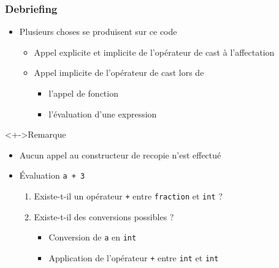 \begin{frame}
\frametitle{Debriefing}
\begin{itemize}[<+->]
\item Plusieurs choses se produisent sur ce code
	\begin{itemize}
	\item Appel explicite et implicite de l'opérateur de cast à l'affectation
	\item Appel implicite de l'opérateur de cast lors de 
		\begin{itemize}
		\item l'appel de fonction
		\item l'évaluation d'une expression
		\end{itemize}
	\end{itemize}
\end{itemize}
\begin{alertblock}<+->{Remarque}
	\begin{itemize}
	\item Aucun appel au constructeur de recopie n'est effectué
	\end{itemize}
\end{alertblock}
\begin{itemize}[<+->]
\item Évaluation \texttt{a + 3}
	\begin{enumerate}[<+->]
	\item Existe-t-il un opérateur \texttt{+} entre \texttt{fraction} et \lstinline|int| ?
	\item Existe-t-il des conversions possibles ?
		\begin{itemize}
		\item Conversion de \texttt{a} en \lstinline|int|
		\item Application de l'opérateur \texttt{+} entre \lstinline|int| et \lstinline|int|
		\end{itemize}
	\end{enumerate}
\end{itemize}
\end{frame}

